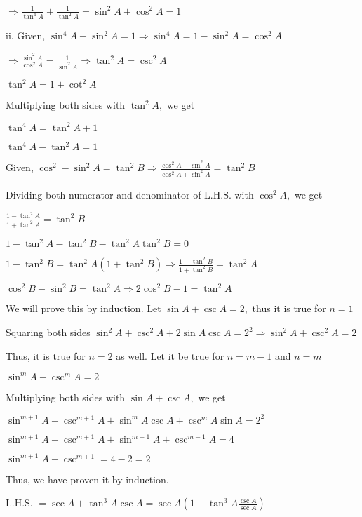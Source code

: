       $\Rightarrow \frac{1}{\tan^4A} + \frac{1}{\tan^2A} = \sin^2A + \cos^2A = 1$

    ii. Given, $\sin^4A + \sin^2A = 1 \Rightarrow \sin^4A = 1 - \sin^2A = \cos^2A$

        $\Rightarrow \frac{\sin^2A}{\cos^2A} = \frac{1}{\sin^2A} \Rightarrow \tan^2A = \csc^2A$

        $\tan^2A = 1 + \cot^2A$

        Multiplying both sides with $\tan^2A,$ we get

        $\tan^4A = \tan^2A + 1$

        $\tan^4A - \tan^2A = 1$

\item Given, $\cos^2 - \sin^2 A = \tan^2 B \Rightarrow \frac{\cos^2A - \sin^2A}{\cos^2A + \sin^2A} = \tan^2B$

    Dividing both numerator and denominator of L.H.S. with $\cos^2A,$ we get

    $\frac{1 - \tan^2A}{1 + \tan^2A} = \tan^2B$

    $1 - \tan^2A - \tan^2B - \tan^2A\tan^2B = 0$

    $1 - \tan^2B = \tan^2A(1 + \tan^2B) \Rightarrow \frac{1 - \tan^2B}{1 + \tan^2B} = \tan^2A$

    $\cos^2B - \sin^2B = \tan^2A \Rightarrow 2\cos^2B - 1 = \tan^2A$

\item We will prove this by induction. Let $\sin A + \csc A = 2,$ thus it is true for $n = 1$

    Squaring both sides $\sin^2A + \csc^2A + 2\sin A\csc A = 2^2 \Rightarrow \sin^2A + \csc^2A = 2$

    Thus, it is true for $n = 2$ as well. Let it be true for $n = m-1$ and $n = m$

    $\sin^mA + \csc^mA = 2$

    Multiplying both sides with $\sin A + \csc A,$ we get

    $\sin^{m + 1}A + \csc^{m + 1}A + \sin^mA\csc A + \csc^mA\sin A = 2^2$

    $\sin^{m + 1}A + \csc^{m + 1}A + \sin^{m - 1}A + \csc^{m - 1}A = 4$

    $\sin^{m + 1}A + \csc^{m + 1} = 4 - 2 = 2$

    Thus, we have proven it by induction.

\item L.H.S. $= \sec A + \tan^3A\csc A = \sec A\left(1 + \tan^3A\frac{\csc A}{\sec A}\right)$

